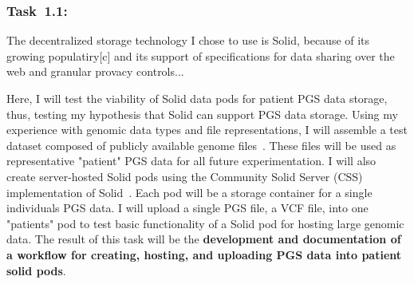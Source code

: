\documentclass[a4paper,11pt]{article}
\begin{document}
\begin{refsection}
\subsubsection{Task~1.1: \WPaa}

The decentralized storage technology I chose to use is Solid, because of its growing populatiry[c] and its support of specifications for data sharing over the web and granular provacy controls... %

Here, I will test the viability of Solid data pods for patient PGS data storage, thus, testing my hypothesis that Solid can support PGS data storage. 
Using my experience with genomic data types and file representations, I will assemble a test dataset composed of publicly available genome files~\cite{platinum_genomes, others...}. 
These files will be used as representative "patient" PGS data for all future experimentation. 
I will also create server-hosted Solid pods using the Community Solid Server (CSS) implementation of Solid~\cite{css}. 
Each pod will be a storage container for a single individual\textquotesingle s PGS data. 
I will upload a single PGS file, a VCF file, into one "patient\textquotesingle s" pod to test basic functionality of a Solid pod for hosting large genomic data. 
The result of this task will be the \textbf{development and documentation of a workflow for creating, hosting, and uploading PGS data into patient solid pods}.





\end{refsection}
\end{document}
